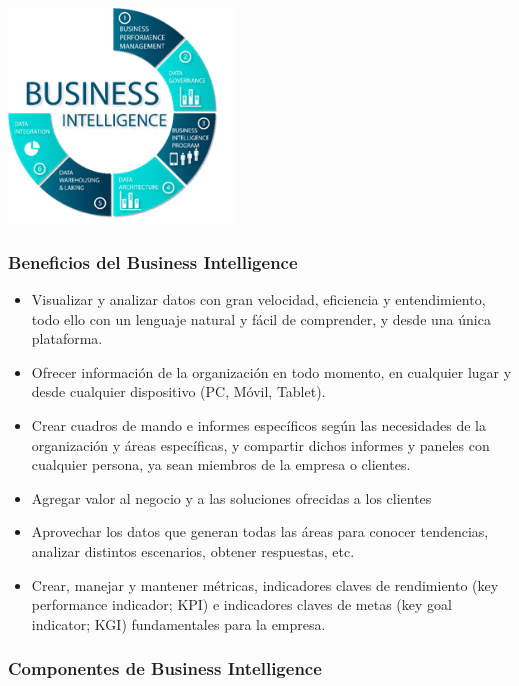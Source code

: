 \documentclass[twoside,twocolumn]{article}
\begin{document}
\includegraphics[width=6cm]{imagenes/img1.png}
\subsubsection{Beneficios del Business Intelligence}
\begin{itemize}
    \item   Visualizar y analizar datos con gran velocidad, eficiencia y entendimiento, todo ello con un lenguaje natural y fácil de comprender, y desde una única plataforma. 
    \item   Ofrecer información de la organización en todo momento, en cualquier lugar y desde cualquier dispositivo (PC, Móvil, Tablet). 
    \item   Crear cuadros de mando e informes específicos según las necesidades de la organización y áreas específicas, y compartir dichos informes y paneles con cualquier persona, ya sean miembros de la empresa o clientes. 
    \item   Agregar valor al negocio y a las soluciones ofrecidas a los clientes
    \item   Aprovechar los datos que generan todas las áreas para conocer tendencias, analizar distintos escenarios, obtener respuestas, etc.
    \item  Crear, manejar y mantener métricas, indicadores claves de rendimiento (key performance indicador; KPI) e indicadores claves de metas (key goal indicator; KGI) fundamentales para la empresa.
\end{itemize}

\subsubsection{Componentes de Business Intelligence}
\end{document}
